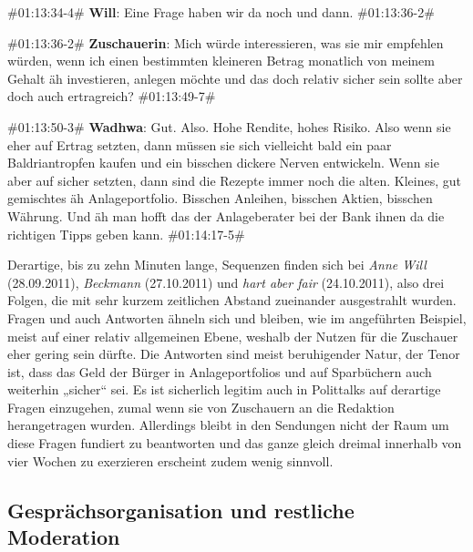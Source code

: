 \begin{description}
	\begin{linenumbers}[1]
		\item \#01:13:34-4\# \textbf{Will}: Eine Frage haben wir da noch und dann.  \#01:13:36-2\# 
		
		\item \#01:13:36-2\# \textbf{Zuschauerin}: Mich würde interessieren, was sie mir empfehlen würden, wenn ich einen bestimmten kleineren Betrag monatlich von meinem Gehalt äh investieren, anlegen möchte und das doch relativ sicher sein sollte aber doch auch ertragreich? \#01:13:49-7\# 
		
		\item \#01:13:50-3\# \textbf{Wadhwa}: Gut. Also. Hohe Rendite, hohes Risiko. Also wenn sie eher auf Ertrag setzten, dann müssen sie sich vielleicht bald ein paar Baldriantropfen kaufen und ein bisschen dickere Nerven entwickeln. Wenn sie aber auf sicher setzten, dann sind die Rezepte immer noch die alten. Kleines, gut gemischtes äh Anlageportfolio. Bisschen Anleihen, bisschen Aktien, bisschen Währung. Und äh man hofft das der Anlageberater bei der Bank ihnen da die richtigen Tipps geben kann. \#01:14:17-5\# 
	\end{linenumbers}
\end{description}

Derartige, bis zu zehn Minuten lange, Sequenzen finden sich bei \textit{Anne Will} (28.09.2011), \textit{Beckmann} (27.10.2011) und \textit{hart aber fair} (24.10.2011), also drei Folgen, die mit sehr kurzem zeitlichen Abstand zueinander ausgestrahlt wurden. Fragen und auch Antworten ähneln sich und bleiben, wie im angeführten Beispiel,  meist auf einer relativ allgemeinen Ebene, weshalb der Nutzen für die Zuschauer eher gering sein dürfte. Die Antworten sind meist beruhigender Natur, der Tenor ist, dass das Geld der Bürger in Anlageportfolios und auf Sparbüchern auch weiterhin „sicher“ sei. Es ist sicherlich legitim auch in Polittalks auf derartige Fragen einzugehen, zumal wenn sie von Zuschauern an die Redaktion herangetragen wurden. Allerdings bleibt in den Sendungen nicht der Raum um diese Fragen fundiert zu beantworten und das ganze gleich dreimal innerhalb von vier Wochen zu exerzieren erscheint zudem wenig sinnvoll.

\subsection{Gesprächsorganisation und restliche Moderation}

